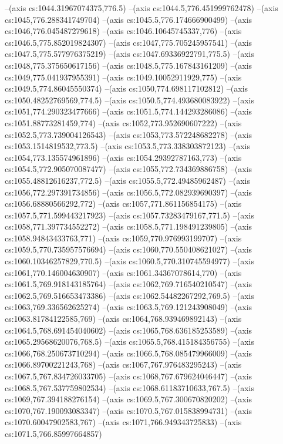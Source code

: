--(axis cs:1044.31967074375,776.5)
--(axis cs:1044.5,776.451999762478)
--(axis cs:1045,776.288341749704)
--(axis cs:1045.5,776.174666900499)
--(axis cs:1046,776.045487279618)
--(axis cs:1046.10645745337,776)
--(axis cs:1046.5,775.852019824307)
--(axis cs:1047,775.705245957541)
--(axis cs:1047.5,775.577976375219)
--(axis cs:1047.69336922791,775.5)
--(axis cs:1048,775.375650617156)
--(axis cs:1048.5,775.167843161209)
--(axis cs:1049,775.041937955391)
--(axis cs:1049.10052911929,775)
--(axis cs:1049.5,774.86045550374)
--(axis cs:1050,774.698117102812)
--(axis cs:1050.48252769569,774.5)
--(axis cs:1050.5,774.493680083922)
--(axis cs:1051,774.290323477666)
--(axis cs:1051.5,774.144293286086)
--(axis cs:1051.88773281459,774)
--(axis cs:1052,773.952690607222)
--(axis cs:1052.5,773.739004126543)
--(axis cs:1053,773.572248682278)
--(axis cs:1053.1514819532,773.5)
--(axis cs:1053.5,773.338303872123)
--(axis cs:1054,773.135574961896)
--(axis cs:1054.29392787163,773)
--(axis cs:1054.5,772.905070087477)
--(axis cs:1055,772.734369886758)
--(axis cs:1055.48812616237,772.5)
--(axis cs:1055.5,772.49485962487)
--(axis cs:1056,772.297391734856)
--(axis cs:1056.5,772.082939690397)
--(axis cs:1056.68880566292,772)
--(axis cs:1057,771.861156854175)
--(axis cs:1057.5,771.599443217923)
--(axis cs:1057.73283479167,771.5)
--(axis cs:1058,771.397734552272)
--(axis cs:1058.5,771.198491239805)
--(axis cs:1058.94843433763,771)
--(axis cs:1059,770.976993199707)
--(axis cs:1059.5,770.735957576694)
--(axis cs:1060,770.550408621027)
--(axis cs:1060.10346257829,770.5)
--(axis cs:1060.5,770.310745594977)
--(axis cs:1061,770.146004630907)
--(axis cs:1061.34367078614,770)
--(axis cs:1061.5,769.918143185764)
--(axis cs:1062,769.716540210547)
--(axis cs:1062.5,769.516653473386)
--(axis cs:1062.54482267292,769.5)
--(axis cs:1063,769.336562625274)
--(axis cs:1063.5,769.121243908049)
--(axis cs:1063.81784122585,769)
--(axis cs:1064,768.939469892143)
--(axis cs:1064.5,768.691454040602)
--(axis cs:1065,768.636185253589)
--(axis cs:1065.29568620076,768.5)
--(axis cs:1065.5,768.415184356755)
--(axis cs:1066,768.250673710294)
--(axis cs:1066.5,768.085479966009)
--(axis cs:1066.89700221243,768)
--(axis cs:1067,767.976483295243)
--(axis cs:1067.5,767.834726033705)
--(axis cs:1068,767.679624046447)
--(axis cs:1068.5,767.537759802534)
--(axis cs:1068.61183710633,767.5)
--(axis cs:1069,767.394188276154)
--(axis cs:1069.5,767.300670820202)
--(axis cs:1070,767.190093083347)
--(axis cs:1070.5,767.015838994731)
--(axis cs:1070.60047902583,767)
--(axis cs:1071,766.949343725833)
--(axis cs:1071.5,766.85997664857)
